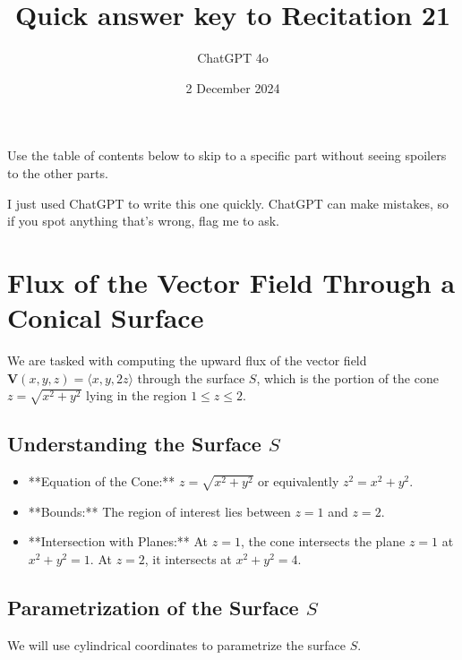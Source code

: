\documentclass[11pt]{article}
\begin{document}
\title{Quick answer key to Recitation 21}
\author{ChatGPT 4o}
\date{2 December 2024}
\maketitle

Use the table of contents below to skip to a specific part
without seeing spoilers to the other parts.

I just used ChatGPT to write this one quickly.
ChatGPT can make mistakes, so if you spot anything that's wrong, flag me to ask.

\tableofcontents



\newpage

\section{Flux of the Vector Field Through a Conical Surface}

We are tasked with computing the upward flux of the vector field \( \mathbf{V}(x, y, z) = \langle x, y, 2z \rangle \) through the surface \( S \), which is the portion of the cone \( z = \sqrt{x^2 + y^2} \) lying in the region \( 1 \leq z \leq 2 \).

\newpage

\subsection{Understanding the Surface \( S \)}

\begin{itemize}
    \item **Equation of the Cone:** \( z = \sqrt{x^2 + y^2} \) or equivalently \( z^2 = x^2 + y^2 \).
    \item **Bounds:** The region of interest lies between \( z = 1 \) and \( z = 2 \).
    \item **Intersection with Planes:** At \( z = 1 \), the cone intersects the plane \( z = 1 \) at \( x^2 + y^2 = 1 \). At \( z = 2 \), it intersects at \( x^2 + y^2 = 4 \).
\end{itemize}

\newpage

\subsection{Parametrization of the Surface \( S \)}

We will use cylindrical coordinates to parametrize the surface \( S \).
\end{document}
